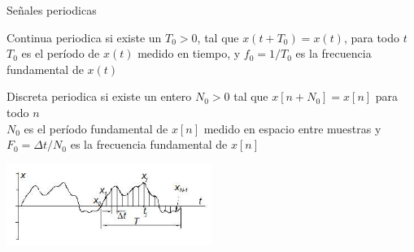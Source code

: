  \begin{frame}{Señales periodicas}
    \begin{block}{Continua periodica}
       si existe un $T_0>0$, tal que $x(t+T_0)=x(t)$, para todo $t$\\
       $T_0$ es el período de $x(t)$ medido en tiempo, y $f_0=1/T_0$ es la frecuencia fundamental de $x(t)$
    \end{block}
    \begin{block}{Discreta periodica}
       si existe un entero $N_0>0$ tal que $x[n+N_0]=x[n]$ para
       todo $n$ \\
       $N_0$ es el período fundamental de $x[n]$ medido en espacio entre muestras
       y  $F_0=\Delta t/N_0$ es la frecuencia fundamental de $x[n]$
    \end{block}
    \center\includegraphics[width=0.5\textwidth]{1_clase/periodica}
    \vfill
 \end{frame}
